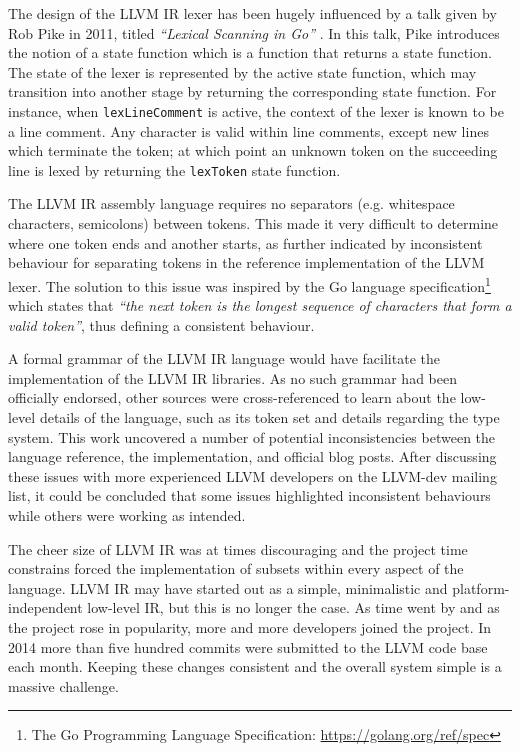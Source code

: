 The design of the LLVM IR lexer has been hugely influenced by a talk given by Rob Pike in 2011, titled \textit{``Lexical Scanning in Go''} \cite{lexical_scanning_in_go}. In this talk, Pike introduces the notion of a state function which is a function that returns a state function. The state of the lexer is represented by the active state function, which may transition into another stage by returning the corresponding state function. For instance, when \texttt{lexLineComment} is active, the context of the lexer is known to be a line comment. Any character is valid within line comments, except new lines which terminate the token; at which point an unknown token on the succeeding line is lexed by returning the \texttt{lexToken} state function.

The LLVM IR assembly language requires no separators (e.g. whitespace characters, semicolons) between tokens. This made it very difficult to determine where one token ends and another starts, as further indicated by inconsistent behaviour for separating tokens in the reference implementation of the LLVM lexer. The solution to this issue was inspired by the Go language specification\footnote{The Go Programming Language Specification: \url{https://golang.org/ref/spec}} which states that \textit{``the next token is the longest sequence of characters that form a valid token''}, thus defining a consistent behaviour.

A formal grammar of the LLVM IR language would have facilitate the implementation of the LLVM IR libraries. As no such grammar had been officially endorsed, other sources were cross-referenced to learn about the low-level details of the language, such as its token set and details regarding the type system. This work uncovered a number of potential inconsistencies between the language reference, the implementation, and official blog posts. After discussing these issues with more experienced LLVM developers on the LLVM-dev mailing list, it could be concluded that some issues highlighted inconsistent behaviours while others were working as intended.

The cheer size of LLVM IR was at times discouraging and the project time constrains forced the implementation of subsets within every aspect of the language. LLVM IR may have started out as a simple, minimalistic and platform-independent low-level IR, but this is no longer the case. As time went by and as the project rose in popularity, more and more developers joined the project. In 2014 more than five hundred commits were submitted to the LLVM code base each month. Keeping these changes consistent and the overall system simple is a massive challenge.

